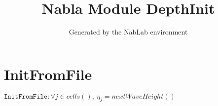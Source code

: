 \documentclass[11pt]{article}
\title{Nabla Module DepthInit}
\author{Generated by the NabLab environment}
\begin{document}
\maketitle


\section{InitFromFile}
$\texttt{InitFromFile} : \forall{j\in cells()}, \ η_{j} = nextWaveHeight\left(\right)$
\end{document}
